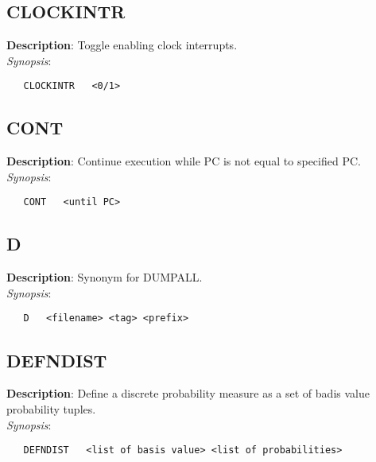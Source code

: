 \subsection{\bf CLOCKINTR}
\label{manpages:CLOCKINTR}
\label{manpages:clockintr}
\vspace{-0.2in}
{\bf Description}:      Toggle enabling clock interrupts.\\[1.5ex]
{\em Synopsis}:
\vspace{-0.2in}
\scriptsize
\begin{verbatim}
   CLOCKINTR   <0/1>					
\end{verbatim}
\normalsize
\vspace{-0.2in}


\subsection{\bf CONT}
\label{manpages:CONT}
\label{manpages:cont}
\vspace{-0.2in}
{\bf Description}: 	Continue execution while PC is not equal to specified PC.\\[1.5ex]
{\em Synopsis}:
\vspace{-0.2in}
\scriptsize
\begin{verbatim}
   CONT   <until PC>	
\end{verbatim}
\normalsize
\vspace{-0.2in}


\subsection{\bf D}
\label{manpages:D}
\label{manpages:d}
\vspace{-0.2in}
{\bf Description}: 	Synonym for DUMPALL.\\[1.5ex]
{\em Synopsis}:
\vspace{-0.2in}
\scriptsize
\begin{verbatim}
   D   <filename> <tag> <prefix>						
\end{verbatim}
\normalsize
\vspace{-0.2in}


\subsection{\bf DEFNDIST}
\label{manpages:DEFNDIST}
\label{manpages:defndist}
\vspace{-0.2in}
{\bf Description}: 	Define a discrete probability measure as a set of badis value probability tuples.\\[1.5ex]
{\em Synopsis}:
\vspace{-0.2in}
\scriptsize
\begin{verbatim}
   DEFNDIST   <list of basis value> <list of probabilities>	
\end{verbatim}
\normalsize
\vspace{-0.2in}


